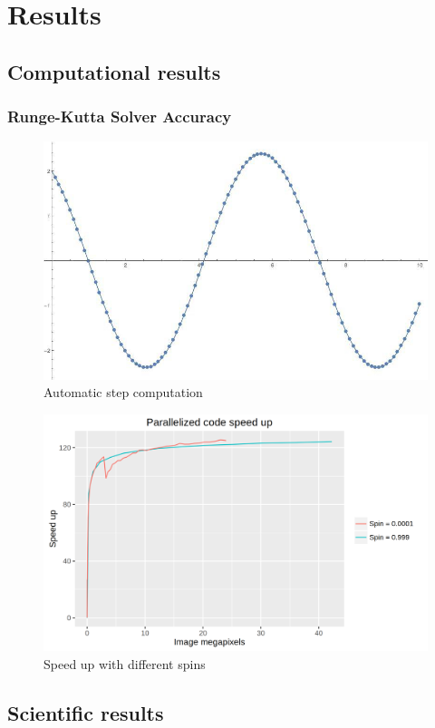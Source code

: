 \chapter{Results}

\section{Computational results}


\subsection{Runge-Kutta Solver Accuracy}

\begin{figure}[bth]
	\myfloatalign
	\includegraphics[width=.5\linewidth]{gfx/stepcomputation.jpg}
	\caption[Automatic step computation]{Automatic step computation}
	\label{fig:stepsize}
\end{figure}

\begin{figure}[bth]
	\myfloatalign
	\includegraphics[width=\linewidth]{gfx/speedup.png}
	\caption[Speed up with different spins]{Speed up with different spins}
	\label{fig:speedup}
\end{figure}


\section{Scientific results}